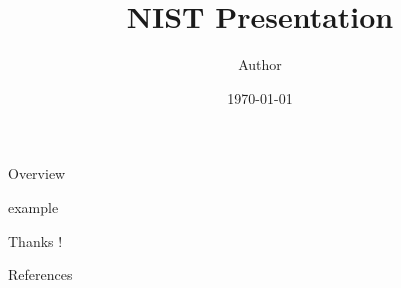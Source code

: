 \documentclass[aspectratio=169]{beamer}
\title{NIST Presentation}
\author[Author]{Author}
\date[\today]{\today}
\begin{document}
  \begin{frame}[plain]
    \titlepage
  \end{frame}

  \begin{frame}{Overview}
    \tableofcontents
  \end{frame}

  {example}

  \begin{frame}[plain]
    \centering
    \LARGE Thanks !
  \end{frame}

  \begin{frame}{References}
    \printbibliography
  \end{frame}
\end{document}
